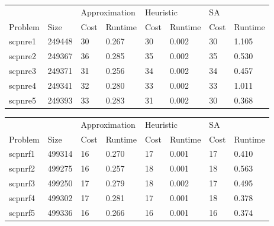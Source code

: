 \documentclass{report}
\begin{document}
\begin{table}[]
\centering
\begin{tabular}{@{}llllllll@{}}
\toprule
        &        & \multicolumn{2}{l}{Approximation} & \multicolumn{2}{l}{Heuristic} & \multicolumn{2}{l}{SA} \\
Problem & Size   & Cost           & Runtime          & Cost         & Runtime        & Cost     & Runtime     \\ \midrule
scpnre1 & 249448 & 30             & 0.267            & 30           & 0.002          & 30       & 1.105       \\
scpnre2 & 249367 & 36             & 0.285            & 35           & 0.002          & 35       & 0.530       \\
scpnre3 & 249371 & 31             & 0.256            & 34           & 0.002          & 34       & 0.457       \\
scpnre4 & 249341 & 32             & 0.280            & 33           & 0.002          & 33       & 1.011       \\
scpnre5 & 249393 & 33             & 0.283            & 31           & 0.002          & 30       & 0.368       \\ \bottomrule
\end{tabular}
\end{table}

\begin{table}[]
\centering
\begin{tabular}{@{}llllllll@{}}
\toprule
        &        & \multicolumn{2}{l}{Approximation} & \multicolumn{2}{l}{Heuristic} & \multicolumn{2}{l}{SA} \\
Problem & Size   & Cost           & Runtime          & Cost         & Runtime        & Cost     & Runtime     \\ \midrule
scpnrf1 & 499314 & 16             & 0.270            & 17           & 0.001          & 17       & 0.410       \\
scpnrf2 & 499275 & 16             & 0.257            & 18           & 0.001          & 18       & 0.563       \\
scpnrf3 & 499250 & 17             & 0.279            & 18           & 0.002          & 17       & 0.495       \\
scpnrf4 & 499302 & 17             & 0.281            & 17           & 0.001          & 18       & 0.378       \\
scpnrf5 & 499336 & 16             & 0.266            & 16           & 0.001          & 16       & 0.374       \\ \bottomrule
\end{tabular}
\end{table}
\end{document}
